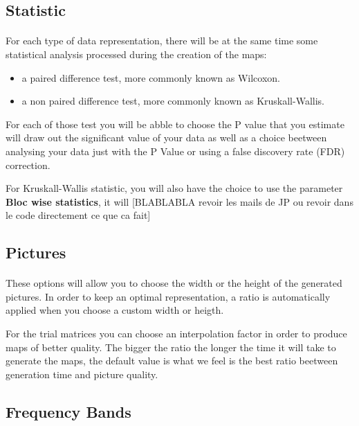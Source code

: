 \documentclass[a4paper]{article}
\begin{document}
\subsection{Statistic}
\paragraph{} For each type of data representation, there will be at the same time some statistical analysis processed during the creation of the maps:

\begin{itemize}
\item a paired difference test,  more commonly known as Wilcoxon.
\item a non paired difference test,  more commonly known as Kruskall-Wallis.
\end{itemize}

For each of those test you will be abble to choose the P value that you estimate will draw out the significant value of your data as well as a choice beetween analysing your data just with the P Value or using a false discovery rate (FDR) correction.

For Kruskall-Wallis statistic, you will also have the choice to use the parameter \textbf{Bloc wise statistics},  it will [BLABLABLA revoir les mails de JP ou revoir dans le code directement ce que ca fait]
\subsection{Pictures}
\paragraph{} These options will allow you to choose the width or the height of the generated pictures. In order to keep an optimal representation, a ratio is automatically applied when you choose a custom width or heigth.

For the trial matrices you can choose an interpolation factor in order to produce maps of better quality. The bigger the ratio the longer the time it will take to generate the maps, the default value is what we feel is the best ratio beetween generation time and picture quality.
\subsection{Frequency Bands}
\end{document}
